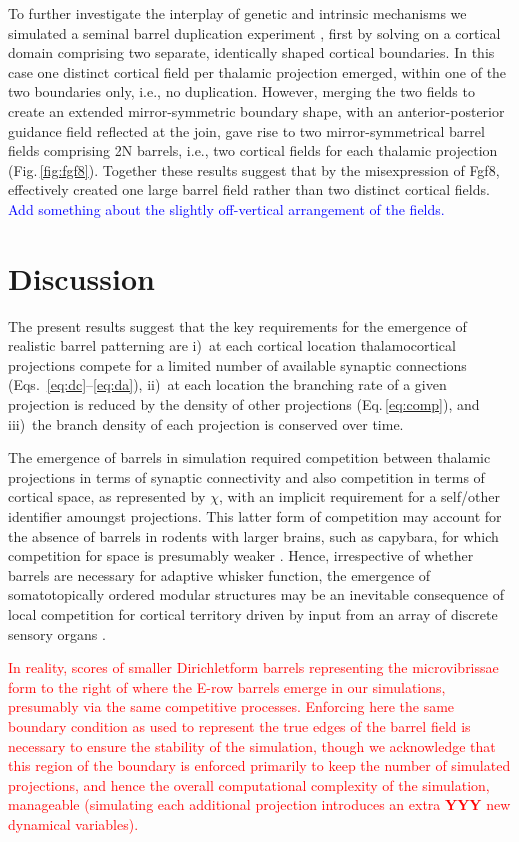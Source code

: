 \documentclass[9pt,lineno,draft]{elife}
\newcommand{\cmnt}[1]{\textcolor{blue}{#1}}
\newcommand{\stu}[1]{\textcolor{red}{#1}}
\begin{document}
To further investigate the interplay of genetic and intrinsic mechanisms we
simulated a seminal barrel duplication experiment
\citep{shimogori_fibroblast_2005}, first by solving on a cortical domain
comprising two separate, identically shaped cortical boundaries. In this case
one distinct cortical field per thalamic projection emerged, within one of the
two boundaries only, i.e., no duplication. However, merging the two fields to
create an extended mirror-symmetric boundary shape, with an anterior-posterior
guidance field reflected at the join, gave rise to two mirror-symmetrical
barrel fields comprising 2N barrels, i.e., two cortical fields for each
thalamic projection (Fig.\,\ref{fig:fgf8}). Together these results suggest that by the
misexpression of Fgf8, \cite{shimogori_fibroblast_2005}
effectively created one large barrel field rather than two distinct cortical
fields. \cmnt{Add something about the slightly off-vertical arrangement of the
  fields.}

\section{Discussion}

The present results suggest that the key requirements for the emergence of
realistic barrel patterning are i)~at each cortical location thalamocortical
projections compete for a limited number of available synaptic connections
(Eqs.~\ref{eq:dc}--\ref{eq:da}), ii)~at each location the branching rate of a
given projection is reduced by the density of other projections
(Eq.\,\ref{eq:comp}), and iii)~the branch density of each projection is
conserved over time.

The emergence of barrels in simulation required competition between thalamic
projections in terms of synaptic connectivity and also competition in terms of
cortical space, as represented by $\chi$, with an implicit requirement for a
self/other identifier amoungst projections. This latter form of competition may account for the absence of barrels in rodents with larger brains, such as
capybara, for which competition for space is presumably weaker
\citep{woolsey_comparative_1975}. Hence, irrespective of whether barrels are
necessary for adaptive whisker function, the emergence of somatotopically
ordered modular structures may be an inevitable consequence of local
competition for cortical territory driven by input from an array of discrete
sensory organs \citep{purves_iterated_1992}.

\stu{In reality, scores of smaller Dirichletform barrels representing the microvibrissae form to the right of where the E-row barrels emerge in our simulations, presumably via the same competitive processes. Enforcing here the same boundary condition as used to represent the true edges of the barrel field is necessary to ensure the stability of the simulation, though we acknowledge that this region of the boundary is enforced primarily to keep the number of simulated projections, and hence the overall computational complexity of the simulation, manageable (simulating each additional projection introduces an extra \textbf{YYY} new dynamical variables).}
\end{document}
